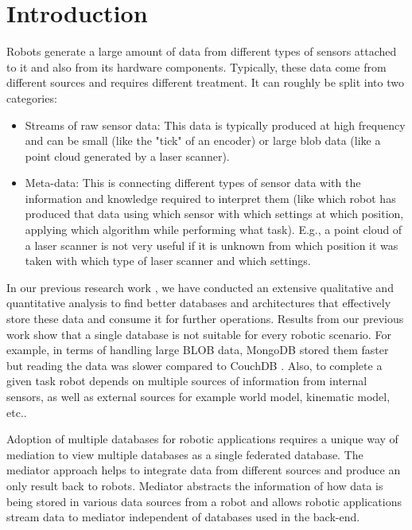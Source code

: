 

    \chapter{Introduction}

Robots generate a large amount of data from different types of sensors attached to it and also from its hardware components. Typically, these data come from different sources and requires different treatment. It can roughly be split into two categories:
\begin{itemize}
	\item Streams of raw sensor data: This data is typically produced at high frequency and can be small (like the "tick" of an encoder) or large blob data (like a point cloud generated by a laser scanner).
	\item Meta-data: This is connecting different types of sensor data with the information and knowledge required to interpret them (like which robot has produced that data using which sensor with which settings at which position, applying which algorithm while performing what task). E.g., a point cloud of a laser scanner is not very useful if it is unknown from which position it was taken with which type of laser scanner and which settings.
\end{itemize}
In our previous research work \cite{ravichandranworkbench}, we have conducted an extensive qualitative and quantitative analysis to find better databases and architectures that effectively store these data and consume it for further operations. Results from our previous work show that a single database is not suitable for every robotic scenario. For example, in terms of handling large BLOB data, MongoDB stored them faster but reading the data was slower compared to CouchDB \cite{ravichandranworkbench}. Also, to complete a given task robot depends on multiple sources of information from internal sensors, as well as external sources for example world model, kinematic model, etc.. 

Adoption of multiple databases for robotic applications requires a unique way of mediation to view multiple databases as a single federated database. The mediator approach helps to integrate data from different sources and produce an only result back to robots. Mediator abstracts the information of how data is being stored in various data sources from a robot and allows robotic applications stream data to mediator independent of databases used in the back-end.

